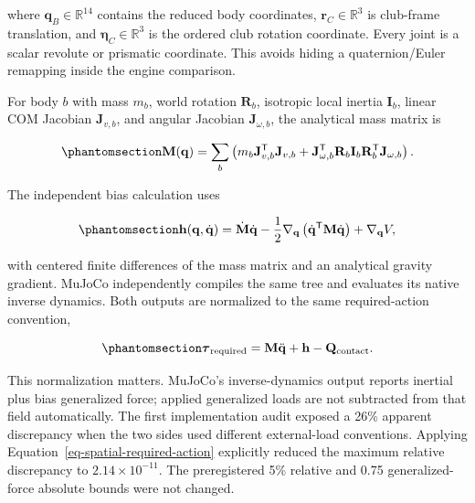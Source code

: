 \documentclass[
  letterpaper,
]{report}
\begin{document}
where \(\mathbf q_B\in\mathbb R^{14}\) contains the reduced body
coordinates, \(\mathbf r_C\in\mathbb R^3\) is club-frame translation,
and \(\boldsymbol\eta_C\in\mathbb R^3\) is the ordered club rotation
coordinate. Every joint is a scalar revolute or prismatic coordinate.
This avoids hiding a quaternion/Euler remapping inside the engine
comparison.

For body \(b\) with mass \(m_b\), world rotation \(\mathbf R_b\),
isotropic local inertia \(\mathbf I_b\), linear COM Jacobian
\(\mathbf J_{v,b}\), and angular Jacobian \(\mathbf J_{\omega,b}\), the
analytical mass matrix is

\begin{equation}\phantomsection\label{eq-spatial-mass-matrix}{
\mathbf M(\mathbf q)=
\sum_b
\left(
m_b\mathbf J_{v,b}^{\mathsf T}\mathbf J_{v,b}
+
\mathbf J_{\omega,b}^{\mathsf T}
\mathbf R_b\mathbf I_b\mathbf R_b^{\mathsf T}
\mathbf J_{\omega,b}
\right).
}\end{equation}

The independent bias calculation uses

\begin{equation}\phantomsection\label{eq-spatial-bias}{
\mathbf h(\mathbf q,\dot{\mathbf q})
=
\dot{\mathbf M}\dot{\mathbf q}
-\frac{1}{2}
\nabla_{\mathbf q}
\left(\dot{\mathbf q}^{\mathsf T}\mathbf M\dot{\mathbf q}\right)
+\nabla_{\mathbf q}V,
}\end{equation}

with centered finite differences of the mass matrix and an analytical
gravity gradient. MuJoCo independently compiles the same tree and
evaluates its native inverse dynamics. Both outputs are normalized to
the same required-action convention,

\begin{equation}\phantomsection\label{eq-spatial-required-action}{
\boldsymbol\tau_{\mathrm{required}}
=
\mathbf M\ddot{\mathbf q}
+\mathbf h
-\mathbf Q_{\mathrm{contact}}.
}\end{equation}

This normalization matters. MuJoCo's inverse-dynamics output reports
inertial plus bias generalized force; applied generalized loads are not
subtracted from that field automatically. The first implementation audit
exposed a 26\% apparent discrepancy when the two sides used different
external-load conventions. Applying
Equation~\ref{eq-spatial-required-action} explicitly reduced the maximum
relative discrepancy to \(2.14\times10^{-11}\). The preregistered 5\%
relative and 0.75 generalized-force absolute bounds were not changed.
\end{document}
